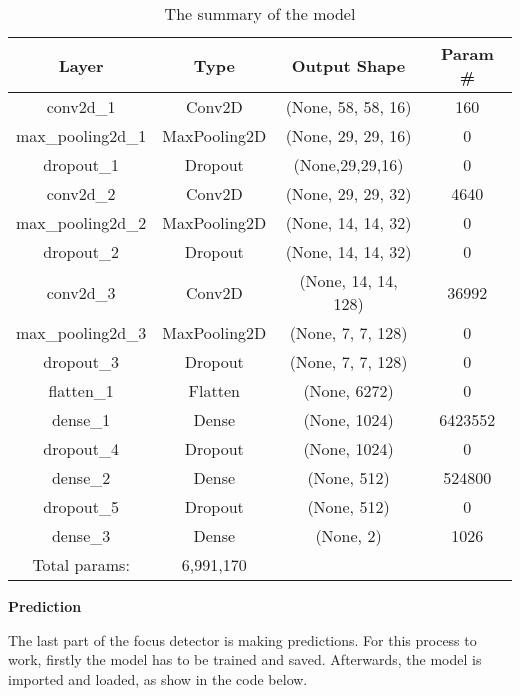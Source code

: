 \begin{table}[h!]
    \centering
    \begin{tabular}{||c c c c||} 
    \hline
    Layer & Type & Output Shape & Param \# \\ [0.5ex] 
    \hline\hline
    conv2d\_1 & Conv2D & (None, 58, 58, 16) & 160 \\ [1ex]
    \hline
    max\_pooling2d\_1 & MaxPooling2D & (None, 29, 29, 16) & 0 \\ [1ex]
    \hline 
    dropout\_1 & Dropout & (None,29,29,16) & 0 \\ [1ex]
    \hline
    conv2d\_2 & Conv2D & (None, 29, 29, 32) & 4640 \\ [1ex]
    \hline
    max\_pooling2d\_2 & MaxPooling2D & (None, 14, 14, 32) & 0 \\ [1ex]
    \hline
    dropout\_2 & Dropout & (None, 14, 14, 32) & 0 \\ [1ex]
    \hline
    conv2d\_3 & Conv2D & (None, 14, 14, 128) & 36992 \\ [1ex]
    \hline
    max\_pooling2d\_3 & MaxPooling2D & (None, 7, 7, 128) & 0 \\ [1ex]
    \hline
    dropout\_3 & Dropout & (None, 7, 7, 128) & 0 \\ [1ex]
    \hline
    flatten\_1 & Flatten & (None, 6272) & 0 \\ [1ex]
    \hline
    dense\_1 & Dense & (None, 1024) & 6423552 \\ [1ex]
    \hline
    dropout\_4 & Dropout & (None, 1024) & 0 \\ [1ex]
    \hline
    dense\_2 & Dense & (None, 512) & 524800 \\ [1ex]
    \hline
    dropout\_5 & Dropout & (None, 512) & 0 \\ [1ex]
    \hline
    dense\_3 & Dense & (None, 2) & 1026 \\ [1ex]
    \hline \hline
    Total params: & 6,991,170 & & \\ 
    \hline
    \end{tabular}
    \caption{The summary of the model}
    \label{table:modelsummary}
\end{table}

\vspace{2ex}
\textbf{Prediction} \par
\vspace{2ex}

The last part of the focus detector is making predictions. For this process to work, firstly the model has to be trained and saved. Afterwards, the model is imported and loaded, as show in the code below.

